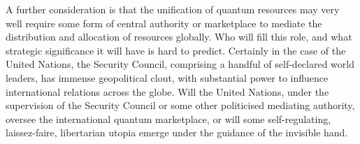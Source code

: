 A further consideration is that the unification of quantum resources may very well require some form of central authority or marketplace to mediate the distribution and allocation of resources globally. Who will fill this role, and what strategic significance it will have is hard to predict. Certainly in the case of the United Nations, the Security Council, comprising a handful of self-declared world leaders, has immense geopolitical clout, with substantial power to influence international relations across the globe. Will the United Nations, under the supervision of the Security Council or some other politicised mediating authority, oversee the international quantum marketplace, or will some self-regulating, laissez-faire, libertarian utopia emerge under the guidance of the invisible hand. 